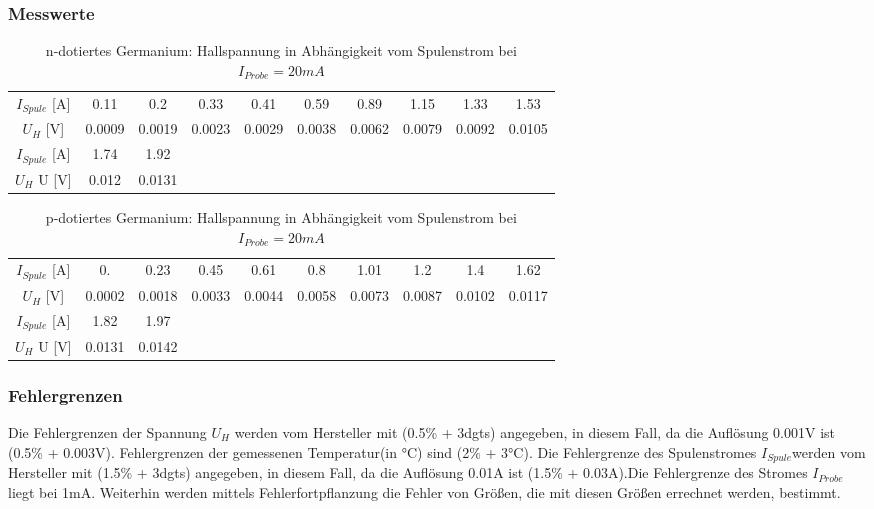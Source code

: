 \subsubsection{Messwerte}
\begin{table}[H]
\centering
\begin{tabular}{|c||c|c|c|c|c|c|c|c|c|}
\hline
$I_{Spule}$ [A] & 0.11 & 0.2 & 0.33 & 0.41 & 0.59 & 0.89 & 1.15 & 1.33 & 1.53  \\
 $U_{H}$ [V] & 0.0009 & 0.0019 & 0.0023 & 0.0029 & 0.0038 & 0.0062 & 0.0079 & 0.0092 & 0.0105  \\
 \hline
 $I_{Spule}$ [A] &  1.74 & 1.92 &  &  & & & & & \\
$U_{H}$ U [V] & 0.012 &
   0.0131 & &  & & & & & \\
 \hline
\end{tabular}
\caption{n-dotiertes Germanium: Hallspannung in Abhängigkeit vom Spulenstrom bei $I_{Probe}=20mA$}
\end{table} 
      
\begin{table}[H]
\centering
\begin{tabular}{|c||c|c|c|c|c|c|c|c|c|}
\hline
$I_{Spule}$ [A] & 0. & 0.23 & 0.45 & 0.61 & 0.8 & 1.01 & 1.2 & 1.4 & 1.62 \\
 $U_{H}$ [V] & 0.0002 & 0.0018 & 0.0033 & 0.0044 & 0.0058 & 0.0073 & 0.0087 & 0.0102 & 0.0117  \\
 \hline
 $I_{Spule}$ [A] &  1.82 & 1.97 &  &  & & & & & \\
$U_{H}$ U [V] & 0.0131
   & 0.0142 & &  & & & & & \\
 \hline
\end{tabular}
\caption{p-dotiertes Germanium: Hallspannung in Abhängigkeit vom Spulenstrom bei $I_{Probe}=20mA$}
\end{table} 

\subsubsection{Fehlergrenzen}
Die Fehlergrenzen der Spannung $U_{H}$ werden vom Hersteller mit (0.5\% + 3dgts) angegeben, in diesem Fall, da die Auflösung 0.001V ist (0.5\% + 0.003V). Fehlergrenzen der gemessenen Temperatur(in °C) sind (2\% + 3°C). Die Fehlergrenze des Spulenstromes $I_{Spule}$werden vom Hersteller mit (1.5\% + 3dgts) angegeben, in diesem Fall, da die Auflösung 0.01A ist (1.5\% + 0.03A).Die Fehlergrenze des Stromes $I_{Probe}$ liegt bei 1mA. Weiterhin werden mittels Fehlerfortpflanzung die Fehler von Größen, die mit diesen Größen errechnet werden, bestimmt.\\


